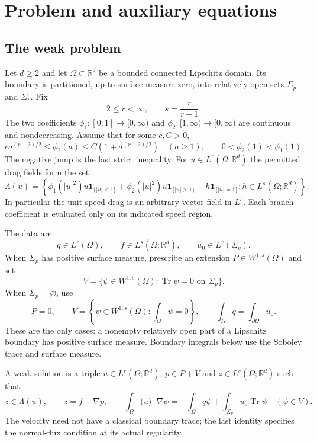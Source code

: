 \documentclass[11pt]{article}
\theoremstyle{remark}
\newcommand{\R}{\mathbb R}
\newcommand{\Tr}{\operatorname{Tr}}
\newcommand{\ind}{\mathbf 1}
\newcommand{\pair}[2]{\int_\Omega \big(#1\big)\cdot #2}
\begin{document}
\section{Problem and auxiliary equations}\label{sec:aux}

\subsection{The weak problem}
Let $d\ge2$ and let $\Omega\subset\R^d$ be a bounded connected Lipschitz
domain. Its boundary is partitioned, up to surface measure zero, into relatively
open sets $\Sigma_p$ and $\Sigma_v$. Fix
\begin{equation}\label{eq:exponents}
 2\le r<\infty,\qquad s=\frac r{r-1}.
\end{equation}
The two coefficients $\phi_1:[0,1]\to[0,\infty)$ and
$\phi_2:[1,\infty)\to[0,\infty)$ are continuous and nondecreasing. Assume
that for some $c,C>0$,
\begin{equation}\label{eq:law-assumptions}
 c a^{(r-2)/2}\le\phi_2(a)\le C(1+a^{(r-2)/2})\quad(a\ge1),
 \qquad 0<\phi_2(1)<\phi_1(1).
\end{equation}
The negative jump is the last strict inequality. For
$u\in L^r(\Omega;\R^d)$ the permitted drag fields form the set
\begin{equation}\label{eq:original-law}
 \Lambda(u)=\left\{
 \phi_1(|u|^2)u\ind_{\{|u|<1\}}
 +\phi_2(|u|^2)u\ind_{\{|u|>1\}}
 +h\ind_{\{|u|=1\}}:
 h\in L^s(\Omega;\R^d)\right\}.
\end{equation}
In particular the unit-speed drag is an arbitrary vector field in $L^s$.
Each branch coefficient is evaluated only on its indicated speed region.

The data are
\[
 q\in L^r(\Omega),\qquad f\in L^s(\Omega;\R^d),\qquad
 u_0\in L^r(\Sigma_v).
\]
When $\Sigma_p$ has positive surface measure, prescribe an extension
$P\in W^{1,s}(\Omega)$ and set
\[
 V=\{\psi\in W^{1,s}(\Omega):\Tr\psi=0\text{ on }\Sigma_p\}.
\]
When $\Sigma_p=\varnothing$, use
\begin{equation}\label{eq:pure-flux}
 P=0,\qquad V=\left\{\psi\in W^{1,s}(\Omega):\int_\Omega\psi=0\right\},
 \qquad \int_\Omega q=\int_{\partial\Omega}u_0.
\end{equation}
These are the only cases: a nonempty relatively open part of a Lipschitz
boundary has positive surface measure. Boundary integrals below use the
Sobolev trace and surface measure.

A weak solution is a triple $u\in L^r(\Omega;\R^d)$, $p\in P+V$ and
$z\in L^s(\Omega;\R^d)$ such that
\begin{equation}\label{eq:weak-problem}
 z\in\Lambda(u),\qquad z=f-\nabla p,\qquad
 \pair{u}{\nabla\psi}=-\int_\Omega q\psi
      +\int_{\Sigma_v}u_0\Tr\psi\quad(\psi\in V).
\end{equation}
The velocity need not have a classical boundary trace; the last identity
specifies the normal-flux condition at its actual regularity.
\end{document}
